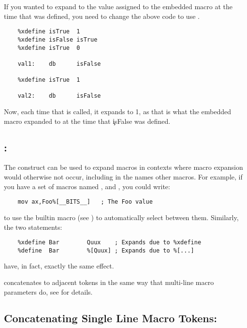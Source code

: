If you wanted  to expand to the value assigned to the
embedded macro  at the time that  was defined,
you need to change the above code to use .

\begin{lstlisting}
	%xdefine isTrue  1
	%xdefine isFalse isTrue
	%xdefine isTrue  0

	val1:    db      isFalse

	%xdefine isTrue  1

	val2:    db      isFalse
\end{lstlisting}

Now, each time that  is called, it expands to 1,
as that is what the embedded macro  expanded to at
the time that \c{isFalse} was defined.

\subsection{: \indexcode{\%[}\code{\%[...]}}
\label{subsec:indmacro}

The \code{\%[...]} construct can be used to expand macros in contexts
where macro expansion would otherwise not occur, including in the
names other macros. For example, if you have a set of macros named
,  and , you could write:

\begin{lstlisting}
	mov ax,Foo%[__BITS__]	; The Foo value
\end{lstlisting}

to use the builtin macro  (see )
to automatically select between them. Similarly, the two statements:

\begin{lstlisting}
	%xdefine Bar		Quux	; Expands due to %xdefine
	%define  Bar		%[Quux]	; Expands due to %[...]
\end{lstlisting}

have, in fact, exactly the same effect.

\code{\%[...]} concatenates to adjacent tokens in the same way that
multi-line macro parameters do, see  for details.

\subsection{Concatenating Single Line Macro Tokens: \codeindex{\%+}}
\label{subsec:concat_macro}

